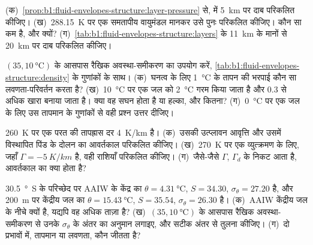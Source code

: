 \begin{exercise}[$\star\star$]\label{exo:b1:fluid-envelopes-structure:6}
(क)~\cref{prop:b1:fluid-envelopes-structure:layer-pressure} से,  में \qty{5}{km} पर दाब परिकलित कीजिए। (ख)~\qty{288.15}{K} पर एक समतापीय वायुमंडल मानकर उसे पुनः परिकलित कीजिए। कौन सा कम है, और क्यों? (ग)~\cref{tab:b1:fluid-envelopes-structure:layers} के \qty{11}{km} के मानों से \qty{20}{km} पर दाब परिकलित कीजिए।
\end{exercise}

\begin{exercise}[$\star\star$]\label{exo:b1:fluid-envelopes-structure:7}
$(35, \qty{10}{\celsius})$ के आसपास रैखिक अवस्था-समीकरण का उपयोग करें, \cref{tab:b1:fluid-envelopes-structure:density} के गुणांकों के साथ। (क)~घनत्व के लिए \qty{1}{\celsius} के तापन की भरपाई कौन सा लवणता-परिवर्तन करता है? (ख)~\qty{10}{\celsius} पर एक जल को \qty{2}{\celsius} गरम किया जाता है और \num{0.3} से अधिक खारा बनाया जाता है। क्या वह सघन होता है या हल्का, और कितना? (ग)~\qty{0}{\celsius} पर एक जल के लिए उस तापमान के गुणांकों से वही प्रश्न उत्तर दीजिए।
\end{exercise}

\begin{exercise}[$\star\star$]\label{exo:b1:fluid-envelopes-structure:8}
\qty{260}{K} पर एक परत की तापह्रास दर \qty{4}{K/km} है। (क)~उसकी उत्प्लावन आवृत्ति और उसमें विस्थापित पिंड के दोलन का आवर्तकाल परिकलित कीजिए। (ख)~\qty{270}{K} पर एक व्युत्क्रमण के लिए, जहाँ $\Gamma = \qty{-5}{K/km}$ है, वही राशियाँ परिकलित कीजिए। (ग)~जैसे-जैसे $\Gamma$, $\Gamma_d$ के निकट आता है, आवर्तकाल का क्या होता है?
\end{exercise}

\begin{exercise}[$\star\star$]\label{exo:b1:fluid-envelopes-structure:9}
\qty{30.5}{\degree S} के परिच्छेद पर AAIW के केंद्र का $\theta =
\qty{4.31}{\celsius}$, $S = 34.30$, $\sigma_\theta = 27.20$ है, और \qty{200}{m} पर केंद्रीय जल का $\theta = \qty{15.43}{\celsius}$, $S = 35.54$, $\sigma_\theta = 26.30$ है। (क)~AAIW केंद्रीय जल के नीचे क्यों है, यद्यपि वह अधिक ताज़ा है? (ख)~$(35, \qty{10}{\celsius})$ के आसपास रैखिक अवस्था-समीकरण से उनके $\sigma_\theta$ के अंतर का अनुमान लगाइए, और सटीक अंतर से तुलना कीजिए। (ग)~दो प्रभावों में, तापमान या लवणता, कौन जीतता है?
\end{exercise}

